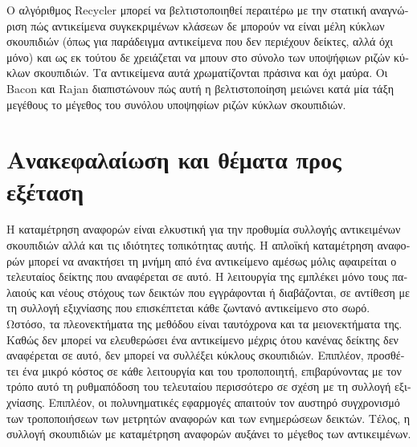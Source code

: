 \begin{greek}
Ο αλγόριθμος Recycler μπορεί να βελτιστοποιηθεί περαιτέρω με
την στατική αναγνώριση πώς αντικείμενα συγκεκριμένων κλάσεων
δε μπορούν να είναι μέλη κύκλων σκουπιδιών (όπως για παράδειγμα
αντικείμενα που δεν περιέχουν δείκτες, αλλά όχι μόνο) και
ως εκ τούτου δε χρειάζεται να μπουν στο σύνολο των υποψήφιων
ριζών κύκλων σκουπιδιών. Τα αντικείμενα αυτά χρωματίζονται
πράσινα και όχι μαύρα. Οι Bacon και Rajan
\cite{DBLP:conf/ecoop/BaconR01} διαπιστώνουν πώς αυτή η
βελτιστοποίηση μειώνει κατά μία τάξη μεγέθους το μέγεθος
του συνόλου υποψηφίων ριζών κύκλων σκουπιδιών. 

\section{Ανακεφαλαίωση και θέματα προς εξέταση}
Η καταμέτρηση αναφορών είναι ελκυστική για την προθυμία
συλλογής αντικειμένων σκουπιδιών αλλά και τις ιδιότητες
τοπικότητας αυτής. Η απλοϊκή καταμέτρηση αναφορών μπορεί
να ανακτήσει τη μνήμη από ένα αντικείμενο αμέσως μόλις
αφαιρείται ο τελευταίος δείκτης που αναφέρεται σε αυτό.
Η λειτουργία της εμπλέκει μόνο τους παλαιούς και νέους
στόχους των δεικτών που εγγράφονται ή διαβάζονται, σε
αντίθεση με τη συλλογή εξιχνίασης που επισκέπτεται κάθε
ζωντανό αντικείμενο στο σωρό. Ωστόσο, τα πλεονεκτήματα
της μεθόδου είναι ταυτόχρονα και τα μειονεκτήματα της.
Καθώς δεν μπορεί να ελευθερώσει ένα αντικείμενο μέχρις
ότου κανένας δείκτης δεν αναφέρεται σε αυτό, δεν μπορεί
να συλλέξει κύκλους σκουπιδιών. Επιπλέον, προσθέτει ένα
μικρό κόστος σε κάθε λειτουργία  και
 του τροποποιητή, επιβαρύνοντας με τον
τρόπο αυτό τη ρυθμαπόδοση του τελευταίου περισσότερο σε
σχέση με τη συλλογή εξιχνίασης. Επιπλέον, οι πολυνηματικές
εφαρμογές απαιτούν τον αυστηρό συγχρονισμό των τροποποιήσεων
των μετρητών αναφορών και των ενημερώσεων δεικτών. Τέλος,
η συλλογή σκουπιδιών με καταμέτρηση αναφορών αυξάνει το
μέγεθος των αντικειμένων.


\end{greek}
